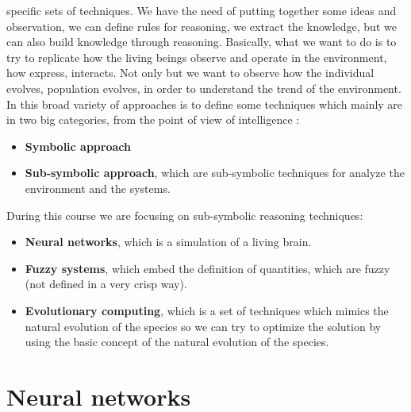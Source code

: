 \documentclass{article}
\begin{document}
specific sets of techniques.
\newline\newline
We have the need of putting together some ideas and observation, we can define rules for reasoning, we extract the knowledge,
but we can also build knowledge through reasoning. Basically, what we want to do is to try to replicate
how the living beings observe and operate in the environment, how express, interacts.
\newline\newline
Not only but we want to observe how the individual evolves, population evolves, in order to understand the trend
of the environment. In this broad variety of approaches is to define some techniques which mainly are
in two big categories, from the point of view of intelligence :
\begin{itemize}
    \item \textbf{Symbolic approach}
    \item \textbf{Sub-symbolic approach}, which are sub-symbolic techniques for analyze the environment
          and the systems.
\end{itemize}
During this course we are focusing on sub-symbolic reasoning techniques:
\begin{itemize}
    \item \textbf{Neural networks}, which is a simulation of a living brain.
    \item \textbf{Fuzzy systems}, which embed the definition of quantities, which are fuzzy (not defined
          in a very crisp way).
    \item \textbf{Evolutionary computing}, which is a set of techniques which mimics the natural evolution of the
          species so we can try to optimize the solution by using the basic concept of the natural evolution of the species.
\end{itemize}

\section{Neural networks}
\end{document}

